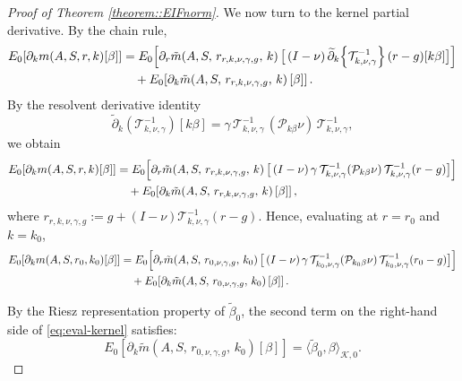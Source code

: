 \documentclass[11pt]{article}
\newcommand{\adk}{\widetilde{\partial}_k}
\theoremstyle{plain}
\begin{document}
\begin{proof}[Proof of Theorem \ref{theorem::EIFnorm}]
We now turn to the kernel partial derivative. By the chain rule,
\begin{align}
E_0[\partial_k m(A,S,r,k)[\beta]]
&= E_0\!\left[\partial_r \tilde{m}\!\left(A,S,\,r_{r,k,\nu,\gamma,g},\,k\right)
      \bigl[\,(I-\nu)\,\adk\!\left\{\mathcal{T}^{-1}_{k,\nu,\gamma}\right\}(r-g)[k\beta]\bigr]\right] \notag \\
&\quad + E_0\!\left[\partial_k \tilde{m}\!\left(A,S,\,r_{r,k,\nu,\gamma,g},\,k\right)[\beta]\right].
\label{eq:chainrule-kernel}
\end{align}
By the resolvent derivative identity
\[
\adk\!\left(\mathcal{T}^{-1}_{k,\nu,\gamma}\right)[k\beta]
= \gamma\,\mathcal{T}^{-1}_{k,\nu,\gamma}\,(\mathcal{P}_{k\beta}\nu)\,\mathcal{T}^{-1}_{k,\nu,\gamma},
\]
we obtain
\begin{align}
E_0[\partial_k m(A,S,r,k)[\beta]]
&= E_0\!\left[\partial_r \tilde{m}\!\left(A,S,\,r_{r,k,\nu,\gamma,g},\,k\right)
      \bigl[\,(I-\nu)\,\gamma\,\mathcal{T}^{-1}_{k,\nu,\gamma}(\mathcal{P}_{k\beta}\nu)\,\mathcal{T}^{-1}_{k,\nu,\gamma}(r-g)\bigr]\right] \notag \\
&\quad + E_0\!\left[\partial_k \tilde{m}\!\left(A,S,\,r_{r,k,\nu,\gamma,g},\,k\right)[\beta]\right],
\label{eq:split-kernel}
\end{align}
where \(r_{r,k,\nu,\gamma,g} := g + (I-\nu)\mathcal{T}^{-1}_{k,\nu,\gamma}(r-g)\).
Hence, evaluating at $r = r_0$ and $k = k_0$,
\begin{align}
E_0[\partial_k m(A,S,r_0,k_0)[\beta]]
&= E_0\!\left[\partial_r \tilde{m}\!\left(A,S,\,r_{0,\nu,\gamma,g},\,k_0\right)
      \bigl[\,(I-\nu)\,\gamma\,\mathcal{T}^{-1}_{k_0,\nu,\gamma}(\mathcal{P}_{k_0\beta}\nu)\,\mathcal{T}^{-1}_{k_0,\nu,\gamma}(r_0-g)\bigr]\right] \notag \\
&\quad + E_0\!\left[\partial_k \tilde{m}\!\left(A,S,\,r_{0,\nu,\gamma,g},\,k_0\right)[\beta]\right].
\label{eq:eval-kernel}
\end{align}

By the Riesz representation property of $\tilde{\beta}_{0}$, the second term on the right-hand side of \eqref{eq:eval-kernel} satisfies:
\begin{equation}
\label{eq:eval-kernel:secondterm}
    E_0\!\left[\partial_k \tilde{m}\!\left(A,S,\,r_{0,\nu,\gamma,g},\,k_0\right)[\beta]\right] = \langle \tilde{\beta}_{0}, \beta \rangle_{\mathcal{K},0}.
\end{equation}
    
 
 


\end{proof}
\end{document}
